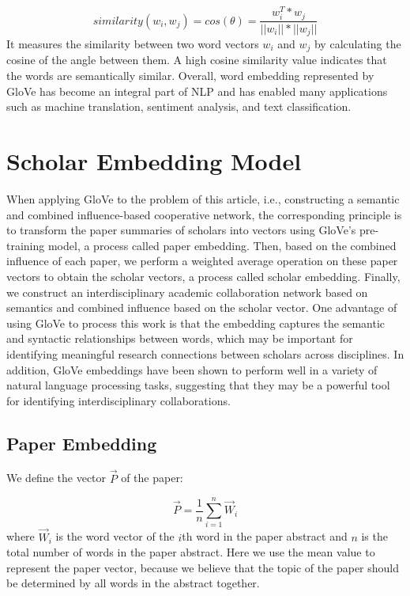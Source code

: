 \documentclass[a4paper]{jpconf}
\begin{document}
\begin{equation}\label{eq:similarity}
    similarity(w_i, w_j) = cos(\theta) = \frac{w_i^T * w_j}{||w_i|| * ||w_j||}
\end{equation}
It measures the similarity between two word vectors \(w_i\) and \(w_j\)
by calculating the cosine of the angle between them. A high cosine
similarity value indicates that the words are semantically similar.
Overall, word embedding represented by GloVe has become an integral part
of NLP and has enabled many applications such as machine translation,
sentiment analysis, and text classification.




\section{Scholar Embedding Model}
When applying GloVe to the problem of this article, i.e., constructing a
semantic and combined influence-based cooperative network, the
corresponding principle is to transform the paper summaries of
scholars into vectors using GloVe's pre-training model, a process called
paper embedding. Then, based on the combined influence of each
paper, we perform a weighted average operation on these paper
vectors to obtain the scholar vectors, a process called scholar
embedding. Finally, we construct an interdisciplinary academic
collaboration network based on semantics and combined influence based on
the scholar vector. One advantage of using GloVe to process this work is
that the embedding captures the semantic and syntactic relationships
between words, which may be important for identifying meaningful
research connections between scholars across disciplines. In addition,
GloVe embeddings have been shown to perform well in a variety of natural
language processing tasks, suggesting that they may be a powerful tool
for identifying interdisciplinary collaborations.


\subsection{Paper Embedding}
We define the vector \(\vec P\) of the paper:

\begin{equation}\label{eq:P}
    \vec P = \frac{1}{n}\sum_{i=1}^{n} \vec W_i
\end{equation}
where \(\vec W_i\) is the word vector of the \(i\)th word in the
paper abstract and \(n\) is the total number of words in the
paper abstract. Here we use the mean value to represent the
paper vector, because we believe that the topic of the paper
should be determined by all words in the abstract together.
\end{document}
